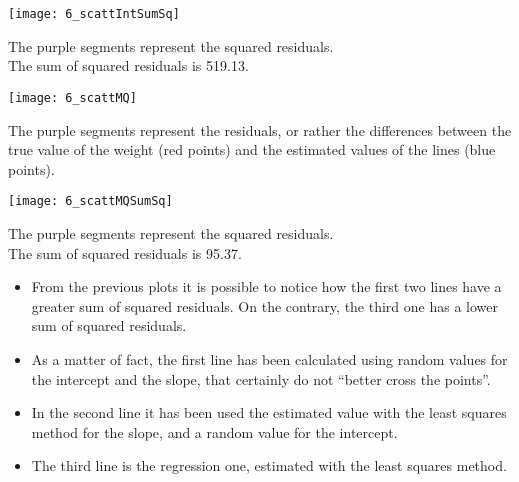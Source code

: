 \begin{frame}
  \begin{center}
    \texttt{[image: 6\_scattIntSumSq]}
  \end{center}
  \vspace{-0.4cm}
  \begin{small}
    The purple segments represent the squared residuals. \\
    The sum of squared residuals is 519.13.
  \end{small}
\end{frame}

\begin{frame}
  \begin{center}
    \texttt{[image: 6\_scattMQ]}
  \end{center}
  \vspace{-0.4cm}
  \begin{small}
    The purple segments represent the residuals, or rather the differences between the true value of the weight (red points) and the estimated values of the lines (blue points).
  \end{small}
\end{frame}

\begin{frame}
  \begin{center}
    \texttt{[image: 6\_scattMQSumSq]}
  \end{center}
  \vspace{-0.4cm}
  \begin{small}
    The purple segments represent the squared residuals. \\
    The sum of squared residuals is 95.37.
  \end{small}
\end{frame}

\begin{frame}
  \vspace{0.25cm}
  \begin{itemize}
    \item From the previous plots it is possible to notice how the first two lines have a greater sum of squared residuals. On the contrary, the third one has a lower sum of squared residuals.
    \vspace{0.20cm}
    \item As a matter of fact, the first line has been calculated using random values for the intercept and the slope, that certainly do not ``better cross the points''.
    \vspace{0.20cm}
    \item In the second line it has been used the estimated value with the least squares method for the slope, and a random value for the intercept.
    \vspace{0.20cm}
    \item The third line is the regression one, estimated with the least squares method.
  \end{itemize}
\end{frame}

